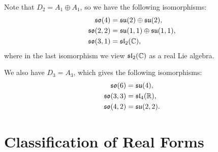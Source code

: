 \begin{example}
\begin{enumerate}
      Note that $D_2 = A_1 \oplus A_1$,
      so we have the following isomorphisms:
      \begin{align*}
        \mathfrak{so}(4)
        &= \mathfrak{su}(2) \oplus \mathfrak{su}(2), \\
        \mathfrak{so}(2, 2)
        &= \mathfrak{su}(1, 1) \oplus \mathfrak{su}(1, 1), \\
        \mathfrak{so}(3, 1)
        &= \mathfrak{sl}_2(\mathbb{C}),
      \end{align*}
      where in the last isomorphism we view
      $\mathfrak{sl}_2(\mathbb{C})$ as a real Lie algebra.

      We also have $D_3 = A_3$, which
      gives the following isomorphisms:
      \begin{align*}
        \mathfrak{so}(6) &= \mathfrak{su}(4), \\
        \mathfrak{so}(3, 3) &= \mathfrak{sl}_4(\mathbb{R}), \\
        \mathfrak{so}(4, 2) &= \mathfrak{su}(2, 2).
      \end{align*}
  \end{enumerate}
\end{example}

\section{Classification of Real Forms}

